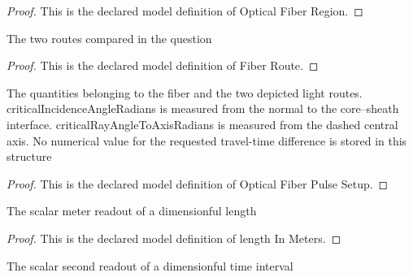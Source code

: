 \begin{proof}
  This is the declared model definition of Optical Fiber Region.
\end{proof}
\begin{definition}
  \label{def:physics:phyx-mini-0086:phyxminiproblems-problemphyxmini0086-fiberroute}
  The two routes compared in the question
\end{definition}
\begin{proof}
  This is the declared model definition of Fiber Route.
\end{proof}
\begin{definition}
  \label{def:physics:phyx-mini-0086:phyxminiproblems-problemphyxmini0086-opticalfiberpulsesetup}
  The quantities belonging to the fiber and the two depicted light routes. criticalIncidenceAngleRadians is measured from the normal to the core--sheath interface. criticalRayAngleToAxisRadians is measured from the dashed central axis. No numerical value for the requested travel-time difference is stored in this structure
\end{definition}
\begin{proof}
  This is the declared model definition of Optical Fiber Pulse Setup.
\end{proof}
\begin{definition}
  \label{def:physics:phyx-mini-0086:phyxminiproblems-problemphyxmini0086-lengthinmeters}
  The scalar meter readout of a dimensionful length
\end{definition}
\begin{proof}
  This is the declared model definition of length In Meters.
\end{proof}
\begin{definition}
  \label{def:physics:phyx-mini-0086:phyxminiproblems-problemphyxmini0086-timeinseconds}
  The scalar second readout of a dimensionful time interval
\end{definition}
